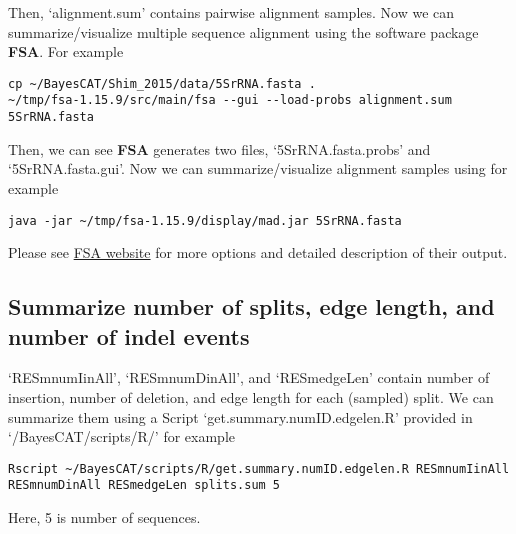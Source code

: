 \documentclass[11pt]{article}
\begin{document}
Then, `alignment.sum' contains pairwise alignment samples. Now we can summarize/visualize multiple sequence alignment using the software package \textbf{FSA}. For example
\begin{lstlisting}
cp ~/BayesCAT/Shim_2015/data/5SrRNA.fasta .
~/tmp/fsa-1.15.9/src/main/fsa --gui --load-probs alignment.sum 5SrRNA.fasta
\end{lstlisting}

Then, we can see \textbf{FSA} generates two files, `5SrRNA.fasta.probs' and `5SrRNA.fasta.gui'. Now we can summarize/visualize alignment samples using for example
\begin{lstlisting}
java -jar ~/tmp/fsa-1.15.9/display/mad.jar 5SrRNA.fasta
\end{lstlisting}

Please see \href{http://fsa.sourceforge.net/}{FSA website} for more options and detailed description of their output.

\subsection{Summarize number of splits, edge length, and number of indel events}
\label{sec-3-4}
`RESmnumIinAll', `RESmnumDinAll', and `RESmedgeLen' contain number of insertion, number of deletion, and edge length for each (sampled) split. We can summarize them using a Script `get.summary.numID.edgelen.R' provided in `/BayesCAT/scripts/R/' for example
\begin{lstlisting}
Rscript ~/BayesCAT/scripts/R/get.summary.numID.edgelen.R RESmnumIinAll RESmnumDinAll RESmedgeLen splits.sum 5
\end{lstlisting}
Here, 5 is number of sequences. 
\end{document}
